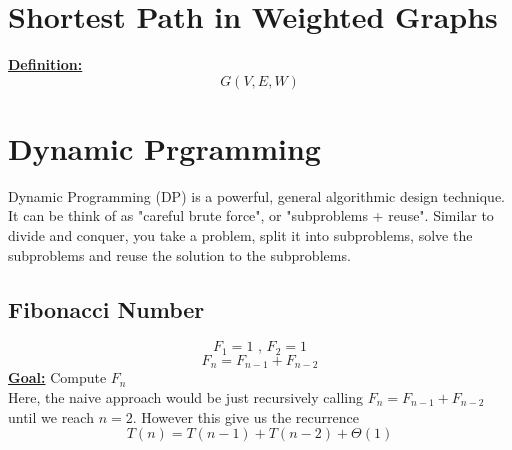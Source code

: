 \documentclass[a4paper]{article}
\renewcommand{\sb}{\vspace*{4px} \\}
\begin{document}
\section{Shortest Path in Weighted Graphs}
\underline{\textbf{Definition:}}
\[ G(V, E, W) \]

\section{Dynamic Prgramming} 
Dynamic Programming (DP) is a powerful, general algorithmic design technique. 
It can be think of as "careful brute force", or "subproblems + reuse". Similar 
to divide and conquer, you take a problem, split it into subproblems, solve the 
subproblems and reuse the solution to the subproblems.
\subsection{Fibonacci Number}
\[ F_1 = 1 \text{ , } F_2 = 1 \]
\[ F_n = F_{n-1} + F_{n-2} \]
\underline{\textbf{Goal:}} Compute $F_n$ \sb
Here, the naive approach would be just recursively calling $F_n = F_{n-1} + F_{n-2}$ 
until we reach $n=2$. However this give us the recurrence
\[ T(n) = T(n-1) + T(n-2) + \Theta(1) \]
        
\end{document}
